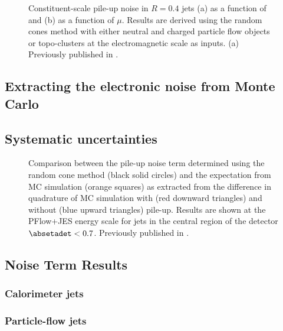 \begin{figure}
    \caption{Constituent-scale pile-up noise in \antikt $R=0.4$ jets (a) as a function of \absetadet and (b) as a function of $\mu$. Results are derived using the random cones method with either neutral and charged particle flow objects or topo-clusters at the electromagnetic scale as inputs. (a)
        Previously published in .}
    \label{fig:const-scale-noise-results}
\end{figure}



\subsection{Extracting the electronic noise from Monte Carlo}

\subsection{Systematic uncertainties}


\begin{figure}
    \caption{Comparison between the pile-up noise term \Npileup determined using the random cone method (black solid circles) and the expectation from MC simulation (orange squares) as extracted from the difference in quadrature of MC simulation with (red downward triangles) and without (blue upward triangles) pile-up. Results are shown at the PFlow+JES energy scale for jets in the central region of the detector $\absetadet < 0.7$. Previously published in .}
    \label{fig:non-closure}
\end{figure}


\subsection{Noise Term Results}
\subsubsection{Calorimeter jets}
\subsubsection{Particle-flow jets}

